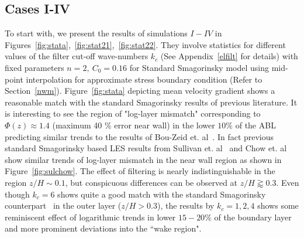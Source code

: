 \subsection{Cases I-IV}
To start with, we present the results of simulations $I-IV$ in Figures~\ref{fig:stata},~\ref{fig:stat21},~\ref{fig:stat22}. They involve statistics for different values of the filter cut-off wave-numbers $k_{c}$ (See Appendix~\ref{elfilt} for details)  with fixed parameters $n = 2, \ C_0 = 0.16$ for Standard Smagorinsky model using mid-point interpolation for approximate stress boundary condition (Refer to Section~\ref{nwm}). Figure~\ref{fig:stata} depicting mean velocity gradient shows a reasonable match with the standard Smagorinsky results of previous literature. It is interesting to see the region of "log-layer mismatch" corresponding to $\Phi(z) \approx 1.4$ (maximum 40 \% error near wall) in the lower $10\%$ of the ABL predicting similar trends to the results of Bou-Zeid et. al~\cite{bou1}. In fact previous standard Smagorinsky based LES results from Sullivan et. al~\cite{sull} and Chow et. al~\cite{chow} show similar trends of log-layer mismatch in the near wall region as shown in Figure~\ref{fig:sulchow}. The effect of filtering is {nearly} indistinguishable in the region $z/H \sim 0.1$, but conspicuous differences can be observed {at $z/H \gtrapprox 0.3$.}
{Even though $k_c = 6$ shows quite {a} good match with the standard Smagorinsky counterpart~\cite{bou1} in the outer layer ($z/H > 0.3$), the results by $k_c = 1, 2, 4$ shows some reminiscent effect of logarithmic trends in lower $15-20 \%$ of the boundary layer~\cite{meyers2} and more prominent deviations into the ``wake region".} 

